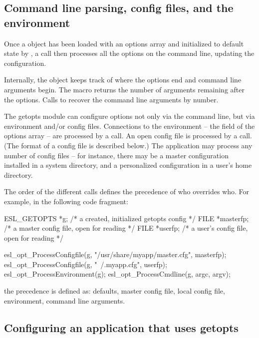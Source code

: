 \subsection{Command line parsing, config files, and the environment}

Once a  object has been loaded with an options
array and initialized to default state by
, a 
call then processes all the options on the command line, updating the
configuration. 

Internally, the object keeps track of where the options end and
command line arguments begin. The macro 
returns the number of arguments remaining after the options.  Calls to
 recover the command line arguments by
number.

The getopts module can configure options not only via the command
line, but via environment and/or config files.  Connections to the
environment -- the  field of the options array -- are
processed by a  call.  An open
config file is processed by a 
call. (The format of a config file is described below.) The
application may process any number of config files -- for instance,
there may be a master configuration installed in a system directory,
and a personalized configuration in a user's home directory.

The order of the different  calls defines the
precedence of who overrides who. For example, in the following code
fragment:

\begin{cchunk}
   ESL_GETOPTS *g;        /* a created, initialized getopts config  */
   FILE *masterfp;        /* a master config file, open for reading */
   FILE *userfp;          /* a user's config file, open for reading */

   esl_opt_ProcessConfigfile(g, "/usr/share/myapp/master.cfg", masterfp);
   esl_opt_ProcessConfigfile(g, "~/.myapp.cfg",                userfp);
   esl_opt_ProcessEnvironment(g);
   esl_opt_ProcessCmdline(g, argc, argv);
\end{cchunk}

the precedence is defined as: defaults, master config file, local
config file, environment, command line arguments. 


\subsection{Configuring an application that uses getopts}

